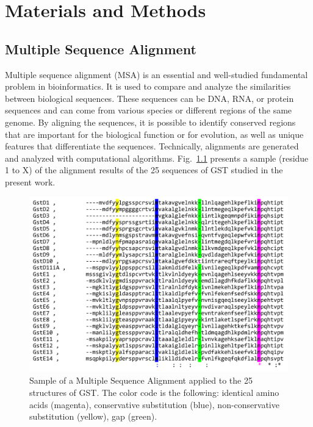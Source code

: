 \chapter{Materials and Methods}
\section{Multiple Sequence Alignment}

Multiple sequence alignment (MSA) is an essential and well-studied fundamental problem in bioinformatics. It is used to compare and analyze the similarities between biological sequences. These sequences can be DNA, RNA, or protein sequences and can come from various species or different regions of the same genome. By aligning the sequences, it is possible to identify conserved regions that are important for the biological function or for evolution, as well as unique features that differentiate the sequences. Technically, alignments are generated and analyzed with computational algorithms. Fig.~\ref{FIG1} presents a sample (residue 1 to X) of the alignment results of the 25 sequences of GST studied in the present work. 

\begin{figure}[h!]
	\includegraphics[width=12cm]{figures/MSA_sample.png}
	\caption{Sample of a Multiple Sequence Alignment applied to the 25 structures of GST. The color code is the following: identical amino acids (magenta), conservative substitution (blue), non-conservative substitution (yellow), gap (green).}
	\label{FIG1}
\end{figure}

